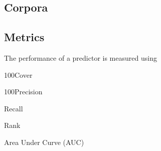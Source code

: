 \subsection{Corpora}
\begin{description}
    \item[\compcert]
    \item[\formalin]
    \item[\corn]
    \item[\mathcomp]
\end{description}

\subsection{Metrics}
The performance of a predictor is measured using 

\begin{definition}{100Cover}
\end{definition}

\begin{definition}{100Precision}
\end{definition}

\begin{definition}{Recall}
\end{definition}

\begin{definition}{Rank}
\end{definition}

\begin{definition}{Area Under Curve (AUC)}
\end{definition}


